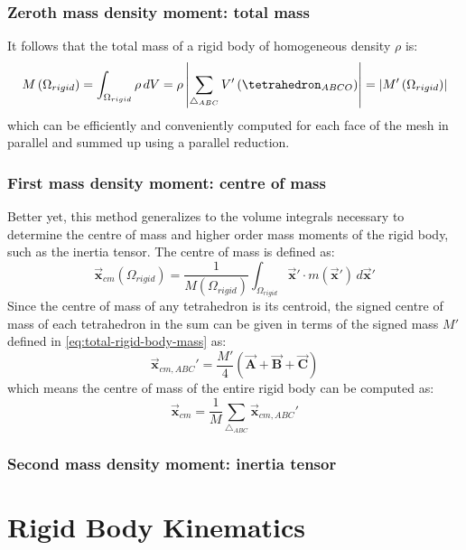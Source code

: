\documentclass[oneside, a4paper]{book}
\newcommand\abs[1]{\left|#1\right|}
\newcommand\vek[1]{\vec{\bm{#1}}}
\newcommand\br[1]{\left(#1\right)}
\begin{document}
    \subsubsection{Zeroth mass density moment: total mass}
    It follows that the total mass of a rigid body of homogeneous density $\rho$ is:
    \begin{equation}\label{eq:total-rigid-body-mass}
      M\br{\Omega_{rigid}} = \int_{\Omega_{rigid}} \rho \,dV = \rho \abs{\sum_{\triangle_{ABC}} V'\br{\tetrahedron_{ABCO}}} = \abs{M'\br{\Omega_{rigid}}}
    \end{equation}
    which can be efficiently and conveniently computed for each face of the mesh in parallel and summed up using a parallel reduction.

    \subsubsection{First mass density moment: centre of mass}
    Better yet, this method generalizes to the volume integrals necessary to determine the centre of mass and higher order mass moments of the rigid body, such as the inertia tensor. The centre of mass is defined as:
    \begin{equation}
      \vek{x}_{cm}\br{\Omega_{rigid}} = \frac{1}{M\br{\Omega_{rigid}}}\int_{\Omega_{rigid}} \vek{x}' \cdot m\br{\vek{x}'} \, d\vek{x}'
    \end{equation}
    Since the centre of mass of any tetrahedron is its centroid, the signed centre of mass of each tetrahedron in the sum can be given in terms of the signed mass $M'$ defined in \autoref{eq:total-rigid-body-mass} as:
    \begin{equation}
      \vek{x}_{cm,ABC}' = \frac{M'}{4}\br{\vek{A}+\vek{B}+\vek{C}}
    \end{equation}
    which means the centre of mass of the entire rigid body can be computed as:
    \begin{equation}
      \vek{x}_{cm} = \frac{1}{M} \sum_{\triangle_{ABC}} \vek{x}_{cm,ABC}'
    \end{equation}

    \subsubsection{Second mass density moment: inertia tensor}\label{subsubsec:inertia-tensor-computation}

    \section{Rigid Body Kinematics}\label{sec:rigid-bodies}
\end{document}
